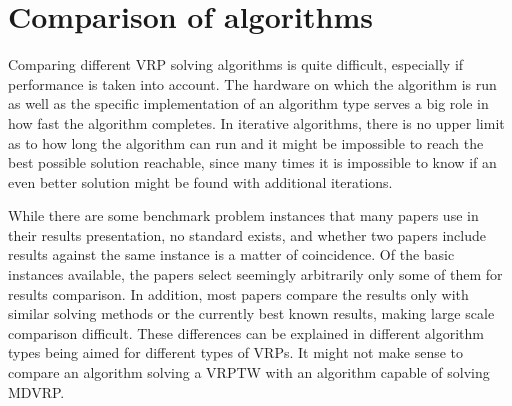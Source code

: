 \section{Comparison of algorithms}

Comparing different VRP solving algorithms is quite difficult, especially if performance is taken into account. The hardware on which the algorithm is run as well as the specific implementation of an algorithm type serves a big role in how fast the algorithm completes. In iterative algorithms, there is no upper limit as to how long the algorithm can run and it might be impossible to reach the best possible solution reachable, since many times it is impossible to know if an even better solution might be found with additional iterations. 

While there are some benchmark problem instances that many papers use in their results presentation, no standard exists, and whether two papers include results against the same instance is a matter of coincidence. Of the basic instances available, the papers select seemingly arbitrarily only some of them for results comparison. In addition, most papers compare the results only with similar solving methods or the currently best known results, making large scale comparison difficult. These differences can be explained in different algorithm types being aimed for different types of VRPs. It might not make sense to compare an algorithm solving a VRPTW with an algorithm capable of solving MDVRP.







